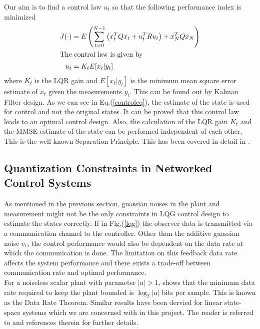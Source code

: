 \documentclass[a4paper,12pt]{article}
\begin{document}
	Our aim is to find a control law $u_{t}$ so that the following performance index is minimized
	\begin{align}
		J(\cdot)&=E\left(\sum\limits_{t=0}^{N-1} \left(x_{t}^{T}Qx_{t} + u_{t}^{T}Ru_{t}\right) + x_{N}^{T}Qx_{N} \right)\\
	\intertext{The control law is given by}
	\label{controleq}
	u_{t}&=K_{t}E[x_{t}|y_{t}]
	\end{align}
	where $K_{t}$ is the LQR gain and $E[x_{t}|y_{t}]$ is the minimum mean square error estimate of $x_{t}$ given the measurements $y_{t}$. This can be found out by Kalman Filter design. As we can see in Eq.(\ref{controleq}), the estimate of the state is used for control and not the original states. It can be proved that this control law leads to an optimal control design. Also, the calculation of the LQR gain $K_{t}$ and the MMSE estimate of the state can be performed independent of each other. This is the well known Separation Principle. This has been covered in detail in \cite{book}. 
	\subsection{Quantization Constraints in Networked Control Systems}
	As mentioned in the previous section, guassian noises in the plant and measurement might not be the only constraints in LQG control design to estimate the states correctly. If in Fig.(\ref{lqg}) the observer data is transmitted via a communication channel to the controller. Other than the additive guassian noise $v_{t}$, the control performance would also be dependent on the data rate at which the communication is done. The limitation on this feedback data rate affects the system performance and there exists a trade-off between communication rate and optimal performance. \\
	For a noiseless scalar plant with parameter $|a|>1$, \cite{quantpaper} shows that the minimum data rate required to keep the plant bounded is $\log_{2}|a|$ bits per sample. This is known as the Data Rate Theorem. Similar results have been dervied for linear state-space systems which we are concerned with in this project. The reader is referred to \cite{quantoverview} and references therein for further details. \\
	
\end{document}
